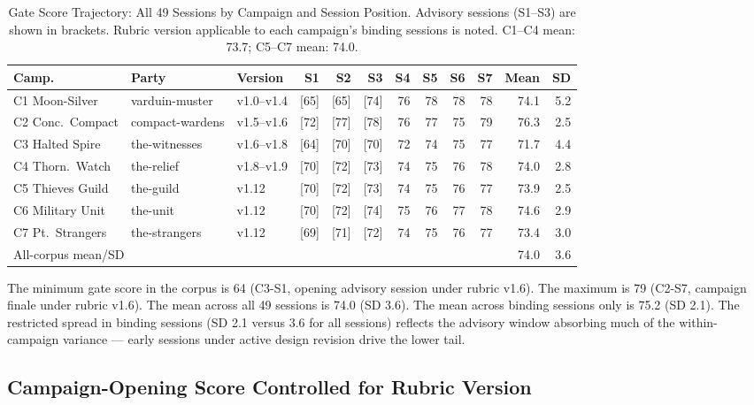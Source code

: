 \begin{table}[t]
\caption{Gate Score Trajectory: All 49 Sessions by Campaign and Session Position.
  Advisory sessions (S1--S3) are shown in brackets. Rubric version applicable to each
  campaign's binding sessions is noted. C1--C4 mean: 73.7; C5--C7 mean: 74.0.}
\label{tab:gate-trajectory}
\begin{tabular}{@{}lllrrrrrrrrr@{}}
\toprule
Camp. & Party & Version & S1 & S2 & S3 & S4 & S5 & S6 & S7 & Mean & SD \\
\midrule
C1 Moon-Silver   & varduin-muster   & v1.0--v1.4  & [65] & [65] & [74] & 76 & 78 & 78 & 78 & 74.1 & 5.2 \\
C2 Conc.\ Compact & compact-wardens & v1.5--v1.6  & [72] & [77] & [78] & 76 & 77 & 75 & 79 & 76.3 & 2.5 \\
C3 Halted Spire  & the-witnesses    & v1.6--v1.8  & [64] & [70] & [70] & 72 & 74 & 75 & 77 & 71.7 & 4.4 \\
C4 Thorn.\ Watch & the-relief       & v1.8--v1.9  & [70] & [72] & [73] & 74 & 75 & 76 & 78 & 74.0 & 2.8 \\
C5 Thieves Guild & the-guild        & v1.12       & [70] & [72] & [73] & 74 & 75 & 76 & 77 & 73.9 & 2.5 \\
C6 Military Unit & the-unit         & v1.12       & [70] & [72] & [74] & 75 & 76 & 77 & 78 & 74.6 & 2.9 \\
C7 Pt.\ Strangers & the-strangers   & v1.12       & [69] & [71] & [72] & 74 & 75 & 76 & 77 & 73.4 & 3.0 \\
\midrule
\multicolumn{3}{l}{All-corpus mean/SD} & & & & & & & & 74.0 & 3.6 \\
\bottomrule
\end{tabular}
\end{table}

The minimum gate score in the corpus is 64 (C3-S1, opening advisory session under
rubric v1.6). The maximum is 79 (C2-S7, campaign finale under rubric v1.6). The mean
across all 49 sessions is 74.0 (SD 3.6). The mean across binding sessions only is
75.2 (SD 2.1). The restricted spread in binding sessions (SD 2.1 versus 3.6 for all
sessions) reflects the advisory window absorbing much of the within-campaign variance
--- early sessions under active design revision drive the lower tail.

\subsection{Campaign-Opening Score Controlled for Rubric Version}

